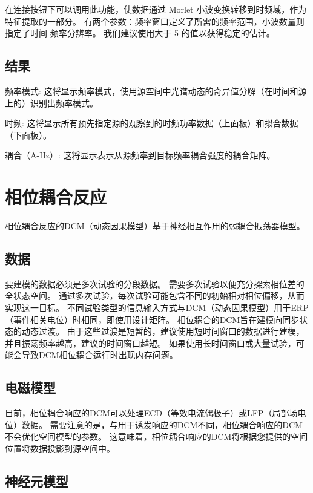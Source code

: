在连接按钮下可以调用此功能，使数据通过 Morlet 小波变换转移到时频域，作为特征提取的一部分。
有两个参数：频率窗口定义了所需的频率范围，小波数量则指定了时间-频率分辨率。
我们建议使用大于 5 的值以获得稳定的估计。


\subsection{结果}

频率模式:
这将显示频率模式，使用源空间中光谱动态的奇异值分解（在时间和源上的）识别出频率模式。

时频:
这将显示所有预先指定源的观察到的时频功率数据（上面板）和拟合数据（下面板）。

耦合（A-Hz）:
这将显示表示从源频率到目标频率耦合强度的耦合矩阵。


\section{相位耦合反应}

相位耦合反应的DCM（动态因果模型）基于神经相互作用的弱耦合振荡器模型。


\subsection{数据}

要建模的数据必须是多次试验的分段数据。
需要多次试验以便充分探索相位差的全状态空间。
通过多次试验，每次试验可能包含不同的初始相对相位偏移，从而实现这一目标。
不同试验类型的信息输入方式与DCM（动态因果模型）用于ERP（事件相关电位）时相同，即使用设计矩阵。
相位耦合的DCM旨在建模向同步状态的动态过渡。
由于这些过渡是短暂的，建议使用短时间窗口的数据进行建模，并且振荡频率越高，建议的时间窗口越短。
如果使用长时间窗口或大量试验，可能会导致DCM相位耦合运行时出现内存问题。


\subsection{电磁模型}

目前，相位耦合响应的DCM可以处理ECD（等效电流偶极子）或LFP（局部场电位）数据。
需要注意的是，与用于诱发响应的DCM不同，相位耦合响应的DCM不会优化空间模型的参数。
这意味着，相位耦合响应的DCM将根据您提供的空间位置将数据投影到源空间中。


\subsection{神经元模型}

